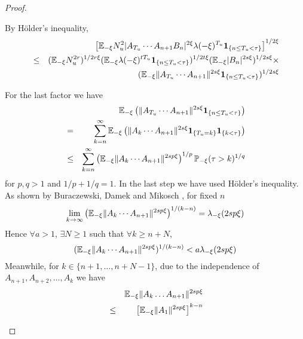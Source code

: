 \documentclass{article}
\theoremstyle{remark}
\begin{document}
\begin{proof}
\begin{enumerate}
\begin{enumerate}
      By H\"older's inequality,
      \begin{eqnarray}
        && \left[ \mathbb{E}_{-\xi} N_u^2 
          |A_{T_u} \cdots A_{n+1} B_n|^{2\xi}
          \lambda(-\xi)^{T_u}
          \mathbf{1}_{\{n \leq T_u < \tau\}} \right]^{1/2\xi} \nonumber \\
        &\leq& (\mathbb{E}_{-\xi} N_u^{2r})^{1/2r\xi}
        (\mathbb{E}_{-\xi} \lambda(-\xi)^{tT_u}\mathbf{1}_{\{n \leq T_u < \tau\}})^{1/2t\xi}
        (\mathbb{E}_{-\xi}|B_n|^{2s\xi})^{1/2s\xi}  \times \nonumber \\
        && (\mathbb{E}_{-\xi} \|A_{T_u} \cdots A_{n+1}\|^{2s\xi}
        \mathbf{1}_{\{n \leq T_u < \tau\}})^{1/2s\xi}
        \label{eq:xi_above_half}
      \end{eqnarray}

      For the last factor we have
      \begin{eqnarray*}
        && \mathbb{E}_{-\xi}\left(\|A_{T_u} \cdots A_{n+1}\|^{2s\xi}
        \mathbf{1}_{\{n \leq T_u < \tau\}}\right) \\
        &=& \sum_{k=n}^\infty \mathbb{E}_{-\xi} \left(
          \|A_k \cdots A_{n+1}\|^{2s\xi}
        \mathbf{1}_{\{T_u = k\}} \mathbf{1}_{\{k < \tau\}}\right)  \\
      &\leq& \sum_{k=n}^\infty
       \left(\mathbb{E}_{-\xi}
         \|A_k \cdots A_{n+1}\|^{2sp\xi}
       \right)^{1/p}
      \mathbb{P}_{-\xi}(\tau > k)^{1/q}
      \end{eqnarray*}
      for $p,q > 1$ and $1/p + 1/q = 1$. In the last step we have used
      H\"older's inequality. As shown by Buraczewski, Damek
      and Mikosch \cite{BuraczewskiDamekMikosch2015}, for fixed $n$
      \[
      \lim_{k \to \infty}
      \left( \mathbb{E}_{-\xi}
        \|A_k \cdots A_{n+1}\|^{2sp\xi}
      \right)^{1/(k-n)} = \lambda_{-\xi}(2sp\xi)
      \]
      Hence $\forall a > 1$, $\exists N \geq 1$ such that $\forall k
      \geq n + N$,
      \[
      (\mathbb{E}_{-\xi}\|A_{k} \cdots A_{n+1}\|^{2sp\xi})^{1/(k-n)} <
      a \lambda_{-\xi}(2sp\xi)
      \]
      Meanwhile, for $k \in \{n+1, \dots, n+N-1\}$, due to the
      independence of $A_{n+1}, A_{n+2}, \dots, A_k$ we have
      \begin{eqnarray*}
        && \E_{-\xi} \|A_k \dots A_{n+1}\|^{2sp\xi} \\
        &\leq& \left[\E_{-\xi} \|A_1\|^{2sp\xi}\right]^{k-n} \\

\end{eqnarray*}
\end{enumerate}
\end{enumerate}
\end{proof}
\end{document}
